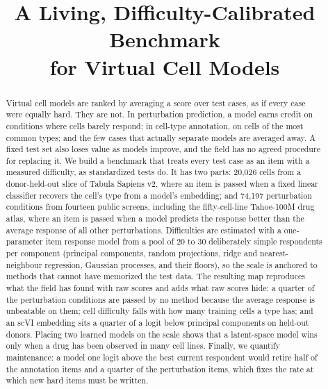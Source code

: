 \documentclass[11pt]{article}
\title{\textbf{A Living, Difficulty-Calibrated Benchmark\\for Virtual Cell Models}}
\author{}
\date{}
\begin{document}
\maketitle
\vspace{-2.5em}

\begin{abstract}
Virtual cell models are ranked by averaging a score over test cases, as if every
case were equally hard. They are not. In perturbation prediction, a model earns
credit on conditions where cells barely respond; in cell-type annotation, on cells of
the most common types; and the few cases that actually separate models are averaged
away. A fixed test set also loses value as models improve, and the field has no
agreed procedure for replacing it. We build a benchmark that treats every test case as
an item with a measured difficulty, as standardized tests do. It has two parts:
20,026 cells from a donor-held-out slice of Tabula Sapiens v2, where an item is passed
when a fixed linear classifier recovers the cell's type from a model's embedding; and
74,197 perturbation conditions from fourteen public screens, including the fifty-cell-line
Tahoe-100M drug atlas, where an item is passed when a model predicts the response
better than the average response of all other perturbations. Difficulties are
estimated with a one-parameter item response model from a pool of 20 to 30 deliberately
simple respondents per component (principal components, random projections, ridge
and nearest-neighbour regression, Gaussian processes, and their floors), so the scale is anchored to
methods that cannot have memorized the test data. The resulting map reproduces what
the field has found with raw scores and adds what raw scores hide: a quarter of the
perturbation conditions are passed by no method because the average response is
unbeatable on them; cell difficulty falls with how many training cells a type has;
and an scVI embedding sits a quarter of a logit below principal components on
held-out donors. Placing two learned models on the scale shows that a latent-space
model wins only when a drug has been observed in many cell lines. Finally, we quantify
maintenance: a model one logit above the best current respondent would retire half of
the annotation items and a quarter of the perturbation items, which fixes the rate at
which new hard items must be written.
\end{abstract}

\end{document}
